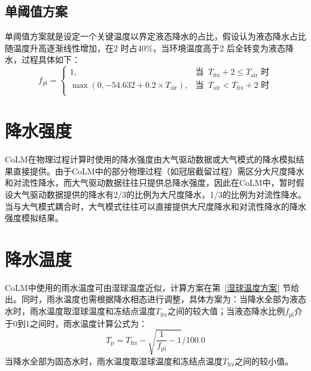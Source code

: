 \subsection{单阈值方案}
单阈值方案就是设定一个关键温度以界定液态降水的占比，假设认为液态降水占比随温度升高逐渐线性增加，在2 \textcelsius 时占40\%，当环境温度高于2 \textcelsius 后全转变为液态降水，过程具体如下：
\begin{equation}
  f_{\mathrm{pl}}= \begin{cases}
    1, & \text{当 }\ T_{\mathrm{frz}}+2\leqslant T_{\mathrm {air}} \text{ 时}\\
    \max(0,-54.632 + 0.2\times T_{\mathrm {air}}), & \text{当 }\ T_{\mathrm {air}} < T_{\mathrm{frz}} + 2 \text{ 时} \\
  \end{cases}
\end{equation}


\section{降水强度}
CoLM在物理过程计算时使用的降水强度由大气驱动数据或大气模式的降水模拟结果直接提供。由于CoLM中的部分物理过程（如冠层截留过程）需区分大尺度降水和对流性降水，而大气驱动数据往往只提供总降水强度，因此在CoLM中，暂时假设大气驱动数据提供的降水有2/3的比例为大尺度降水，1/3的比例为对流性降水。当与大气模式耦合时，大气模式往往可以直接提供大尺度降水和对流性降水的降水强度模拟结果。


\section{降水温度}
CoLM中使用的雨水温度可由湿球温度近似，计算方案在第~\ref{湿球温度方案} 节给出。同时，雨水温度也需根据降水相态进行调整，具体方案为：当降水全部为液态水时，雨水温度取湿球温度和冻结点温度$T_{\mathrm{frz}}$之间的较大值；当液态降水比例$f_{\mathrm{pl}}$介于0到1之间时，雨水温度计算公式为：$$T_{\mathrm {p}}=T_{\mathrm{frz}}-\sqrt{\frac{1}{f_{\mathrm{pl}}}-1}/100.0$$
当降水全部为固态水时，雨水温度取湿球温度和冻结点温度$T_{\mathrm{frz}}$之间的较小值。


